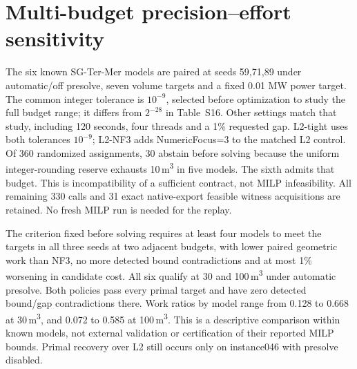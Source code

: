 \documentclass[11pt]{article}
\begin{document}
\FloatBarrier
\section{Multi-budget precision--effort sensitivity}
\label{sec:si-frontier}
The six known SG-Ter-Mer models are paired at seeds 59,71,89 under automatic/off
presolve, seven volume targets and a fixed 0.01 MW power target. The common
integer tolerance is $10^{-9}$, selected before optimization to study the full
budget range; it differs from $2^{-28}$ in Table~S16. Other settings match that
study, including 120 seconds, four threads and a 1\% requested gap. L2-tight uses
both tolerances $10^{-9}$; L2-NF3 adds NumericFocus=3 to the matched L2 control.
Of 360 randomized assignments, 30 abstain before solving because the uniform
integer-rounding reserve exhausts 10\,m\textsuperscript{3} in five models. The
sixth admits that budget. This is incompatibility of a sufficient contract, not
MILP infeasibility. All remaining 330 calls and 31 exact native-export feasible
witness acquisitions are retained. No fresh MILP run is needed for the replay.

The criterion fixed before solving requires at least four models to meet the
targets in all three seeds at two adjacent budgets, with lower paired geometric
work than NF3, no more detected bound contradictions and at most 1\% worsening
in candidate cost. All six qualify at 30 and 100\,m\textsuperscript{3} under
automatic presolve. Both policies pass every primal target and have zero detected
bound/gap contradictions there. Work ratios by model range from 0.128 to 0.668
at 30\,m\textsuperscript{3}, and 0.072 to 0.585 at 100\,m\textsuperscript{3}.
This is a descriptive comparison within known models, not external validation
or certification of their reported MILP bounds. Primal recovery over L2 still
occurs only on instance046 with presolve disabled.

\begin{table}[tb]
\centering\small\setlength{\tabcolsep}{3pt}
\caption{Prespecified sensitivity. Calls counts executed Budget-L2 calls out of
18 assignments; the missing 15 at 10\,m\textsuperscript{3} in each panel are
abstentions. Budgets counts successful rounded points. B/G denotes bound/gap
contradictions against exactly feasible witnesses of the same binary64 export.
NF3 has zero detected B/G flags and satisfies all targets in both panels.
Work and complete-time ratios are paired geometric means against NF3 on the
same executed cases/seeds. All controls are resolved once per case/seed/presolve
and checked at every target. At 3,000 and 10,000\,m\textsuperscript{3}, Budget
exports equal L2; these are not independent representations. Lower effort or
absence of a detected contradiction does not certify MILP optimality.}
\label{tab:precision-frontier}
\resizebox{\linewidth}{!}{}
\end{table}
\end{document}
